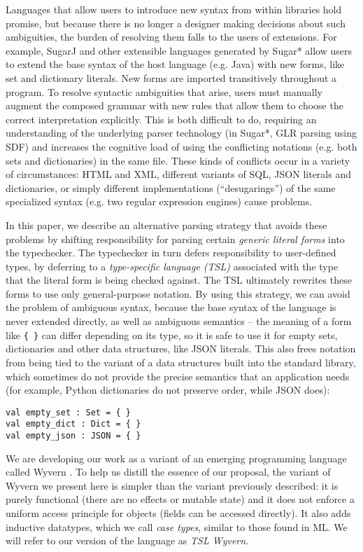 Languages that allow users to introduce new syntax from within libraries hold promise, but because there is no longer a designer making decisions about such ambiguities, the burden of resolving them falls to the users of extensions. For example, SugarJ \cite{Erdweg:2011:SLL:2048147.2048199} and other extensible languages generated by Sugar* \cite{Erdweg:2013:FEL:2517208.2517210} allow users to extend the base syntax of the host language (e.g. Java) with new forms, like set and dictionary literals. New forms are imported transitively throughout a program. To resolve syntactic ambiguities that arise, users must manually augment the composed grammar with new rules that allow them to choose the correct interpretation explicitly. This is both difficult to do, requiring an understanding of the underlying parser technology (in Sugar*, GLR parsing using SDF) and increases the cognitive load of using the conflicting notations (e.g. both sets and dictionaries) in the same file. These kinds of conflicts occur in a variety of circumstances: HTML and XML, different variants of SQL, JSON literals and dictionaries, or simply different implementations (``desugarings'') of the same specialized syntax (e.g. two regular expression engines) cause problems.

In this paper, we describe an alternative parsing strategy that avoids these problems by shifting responsibility for parsing certain \emph{generic literal forms} into the typechecker. The typechecker in turn defers responsibility to user-defined types, by deferring to a \emph{type-specific language (TSL)} associated with the type that the literal form is being checked against. The TSL ultimately rewrites these forms to use only general-purpose notation. By using this strategy, we can avoid the problem of ambiguous syntax, because the base syntax of the language is never extended directly, as well as ambiguous semantics -- the meaning of a form like \verb|{ }| can differ depending  on its type, so it is safe to use it for empty sets, dictionaries and other data structures, like JSON literals. This also frees notation from being tied to the variant of a  data structures built into the standard library, which sometimes do not provide the precise semantics that an application needs (for example, Python dictionaries do not preserve order, while JSON does):
\begin{lstlisting}
val empty_set : Set = { }
val empty_dict : Dict = { }
val empty_json : JSON = { }
\end{lstlisting}
We are developing our work as a variant of an emerging programming language called Wyvern \cite{maspeghi13}. To help us distill the essence of our proposal, the variant of Wyvern we present here is simpler than the variant previously described: it is purely functional (there are no effects or mutable state) and it does not enforce a uniform access principle for objects (fields can be accessed directly). It also adds inductive datatypes, which we call \emph{case types}, similar to those found in ML. We will refer to our version of the language as \emph{TSL Wyvern}. 
 
